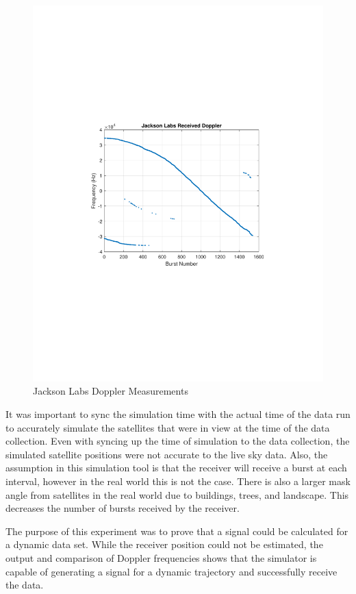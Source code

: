 \documentclass[12pt]{report}
\begin{document}
\begin{figure}[h!]
    \centering
    \includegraphics[trim=1.2in 3.3in 1.75in 3.3in,clip,width=5in]
    {Dynamic_JL_Doppler-2.pdf}
    \caption{Jackson Labs Doppler Measurements}
    \label{fig:JLdynamdop}
\end{figure}

It was important to sync the simulation time with the actual time of the data run to accurately simulate the satellites that were in view at the time of the data collection. Even with syncing up the time of simulation to the data collection, the simulated satellite positions were not accurate to the live sky data. Also, the assumption in this simulation tool is that the receiver will receive a burst at each interval, however in the real world this is not the case. There is also a larger mask angle from satellites in the real world due to buildings, trees, and landscape. This decreases the number of bursts received by the receiver. 

The purpose of this experiment was to prove that a signal could be calculated for a dynamic data set. While the receiver position could not be estimated, the output and comparison of Doppler frequencies shows that the simulator is capable of generating a signal for a dynamic trajectory and successfully receive the data.  
\end{document}
